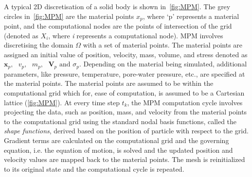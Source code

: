 A typical 2D discretisation of a solid body is shown in~\cref{fig:MPM}. The 
grey circles in~\cref{fig:MPM} are the material points $x_{p}$, where `p' 
represents a material point, and the computational nodes are the points of 
intersection of 
the grid (denoted as $X_{i}$, where \textit{i} represents a computational 
node). MPM involves discretising the domain $\Omega$ with 
a set of material points. The material points are assigned an initial value of 
position, velocity, mass, volume, and stress denoted as $\mathbf{x}_{p},\mbox{  
} \mathbf{\mathit{v}}_{p},\mbox{  } \mathit{m}_{p}, \mbox{  
}\mathbf{V}_{p}\mbox{ and }\sigma_{p} $. Depending on the material being 
simulated, additional parameters, like pressure, temperature, pore-water 
pressure, etc., are specified at the material points. The material points are 
assumed to be within the computational grid which for, ease of computation, 
is assumed to be a Cartesian lattice (\cref{fig:MPM}). At 
every time step $\mathit{t}_{k}$, the MPM computation cycle involves projecting 
the data, such as position, mass, and velocity from the material points to the 
computational grid using the standard nodal basis functions, called the 
\textit{shape functions}, derived based on the position of particle with 
respect to the grid. Gradient terms are calculated on the computational grid 
and the governing equation, i.e. the equation of motion, is solved and the 
updated position and velocity values are mapped back to the material points. 
The mesh is reinitialized to its original state and the computational cycle is 
repeated. 

